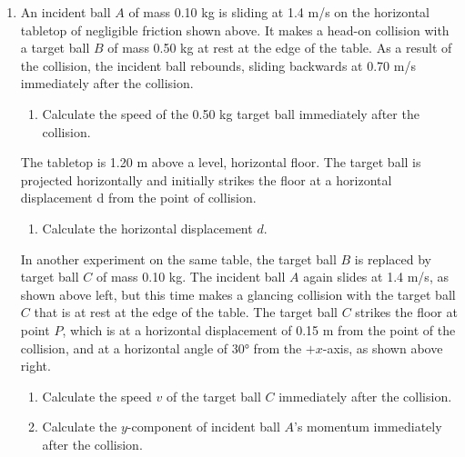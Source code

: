 \documentclass{../../../oss-apphys}
\begin{document}
\begin{enumerate}[leftmargin=15pt]
  \begin{center}
  \end{center}
\item An incident ball $A$ of mass 0.10 kg is sliding at 1.4 m/s on the
  horizontal tabletop of negligible friction shown above. It makes a head-on
  collision with a target ball $B$ of mass 0.50 kg at rest at the edge of the
  table. As a result of the collision, the incident ball rebounds, sliding
  backwards at 0.70 m/s immediately after the collision.
  \begin{enumerate}[noitemsep,topsep=0pt]
  \item Calculate the speed of the 0.50 kg target ball immediately after the
    collision.
  \end{enumerate}
  The tabletop is 1.20 m above a level, horizontal floor. The target ball is
  projected horizontally and initially strikes the floor at a horizontal
  displacement d from the point of collision.
  \begin{enumerate}[noitemsep,topsep=0pt]
  \item Calculate the horizontal displacement $d$.
  \end{enumerate}
  \begin{center}
  \end{center}
  In another experiment on the same table, the target ball $B$ is replaced by
  target ball $C$ of mass 0.10 kg. The incident ball $A$ again slides at
  1.4 m/s, as shown above left, but this time makes a glancing collision with
  the target ball $C$ that is at rest at the edge of the table. The target ball
  $C$ strikes the floor at point $P$, which is at a horizontal displacement of
  0.15 m from the point of the collision, and at a horizontal angle of \ang{30}
  from the $+x$-axis, as shown above right.
  \begin{enumerate}[noitemsep,topsep=0pt]
  \item Calculate the speed $v$ of the target ball $C$ immediately after the
    collision.
  \item Calculate the $y$-component of incident ball $A$'s momentum immediately
    after the collision.
  \end{enumerate}
  \newpage


\end{enumerate}
\end{document}
